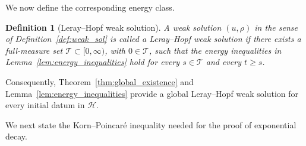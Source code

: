 \documentclass[11pt,reqno]{amsart}
\theoremstyle{plain}
\newtheorem{defn}[thm]{Definition}
\numberwithin{equation}{section}
\begin{document}
\medskip
We now define the corresponding energy class.
\begin{defn}[Leray--Hopf weak solution]\label{def:leray-hopf}
A weak solution $(u,\rho)$ in the sense of Definition~\ref{def:weak_sol} is called a Leray--Hopf weak solution if there exists a full-measure set $\mathcal T\subset[0,\infty)$, with $0\in\mathcal T$, such that the energy inequalities in Lemma~\ref{lem:energy_inequalities} hold for every $s\in\mathcal T$ and every $t\ge s$.
\end{defn}
Consequently, Theorem~\ref{thm:global_existence} and Lemma~\ref{lem:energy_inequalities} provide a global Leray--Hopf weak solution for every initial datum in $\mathcal H$.


We next state the Korn--Poincar\'e inequality needed for the proof of exponential decay. 
\end{document}
